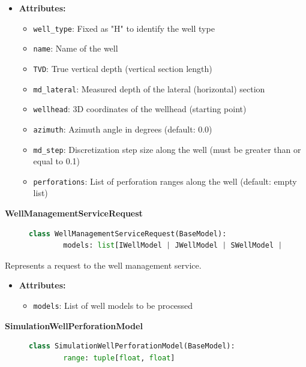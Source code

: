 \begin{itemize}
	\item \textbf{Attributes:}
	\begin{itemize}
		\item \texttt{well\_type}: Fixed as "H" to identify the well type
		\item \texttt{name}: Name of the well
		\item \texttt{TVD}: True vertical depth (vertical section length)
		\item \texttt{md\_lateral}: Measured depth of the lateral (horizontal) section
		\item \texttt{wellhead}: 3D coordinates of the wellhead (starting point)
		\item \texttt{azimuth}: Azimuth angle in degrees (default: 0.0)
		\item \texttt{md\_step}: Discretization step size along the well (must be greater than or equal to 0.1)
		\item \texttt{perforations}: List of perforation ranges along the well (default: empty list)
	\end{itemize}
\end{itemize}

\textbf{WellManagementServiceRequest}
\begin{figure}[H]
	\begin{lstlisting}[language=Python, caption=WellManagementServiceRequest class definition]
		class WellManagementServiceRequest(BaseModel):
		models: list[IWellModel | JWellModel | SWellModel | HWellModel]
	\end{lstlisting}
\end{figure}

Represents a request to the well management service.

\begin{itemize}
	\item \textbf{Attributes:}
	\begin{itemize}
		\item \texttt{models}: List of well models to be processed
	\end{itemize}
\end{itemize}

\textbf{SimulationWellPerforationModel}
\begin{figure}[H]
	\begin{lstlisting}[language=Python, caption=SimulationWellPerforationModel class definition]
		class SimulationWellPerforationModel(BaseModel):
		range: tuple[float, float]
	\end{lstlisting}
\end{figure}


